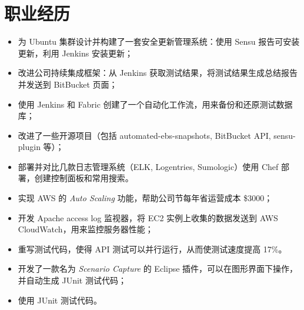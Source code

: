 \documentclass{resume}
\begin{document}
%
%


\section{职业经历}
\begin{itemize}
\item 为 Ubuntu 集群设计并构建了一套安全更新管理系统：使用 Sensu 报告可安装更新，利用 Jenkins  安装更新；
\item 改进公司持续集成框架：从 Jenkins 获取测试结果，将测试结果生成总结报告并发送到 BitBucket 页面；
\item 使用 Jenkins 和 Fabric 创建了一个自动化工作流，用来备份和还原测试数据库；
\item 改进了一些开源项目（包括 automated-ebs-snapshots, BitBucket API, sensu-plugin 等）；
\item 部署并对比几款日志管理系统（ELK, Logentries, Sumologic）使用 Chef 部署，创建控制面板和常用搜索。
\end{itemize}

\begin{itemize}
\item 实现 AWS 的 \emph{Auto Scaling} 功能，帮助公司节每年省运营成本 \$3000；
\item 开发 Apache access log 监视器，将 EC2 实例上收集的数据发送到 AWS CloudWatch，用来监控服务器性能；
\item 重写测试代码，使得 API 测试可以并行运行，从而使测试速度提高 17\%。
\end{itemize}

\begin{itemize}
\item 开发了一款名为 \textit{Scenario Capture} 的 Eclipse 插件，可以在图形界面下操作，并自动生成 JUnit 测试代码；
\item 使用 JUnit 测试代码。
\end{itemize}
\end{document}
